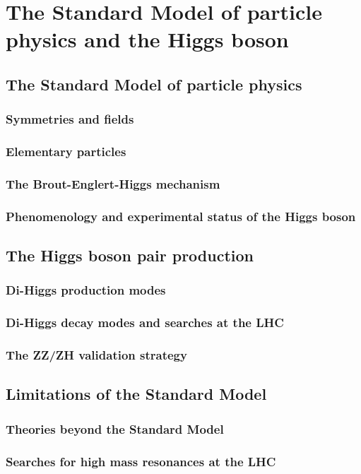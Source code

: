\chapter{The Standard Model of particle physics and the Higgs boson}

\section{The Standard Model of particle physics}
\subsection{Symmetries and fields}
\subsection{Elementary particles}
\subsection{The Brout-Englert-Higgs mechanism}
\subsection{Phenomenology and experimental status of the Higgs boson}

\section{The Higgs boson pair production}
\subsection{Di-Higgs production modes}
\subsection{Di-Higgs decay modes and searches at the LHC}
\subsection{The ZZ/ZH validation strategy}

\section{Limitations of the Standard Model}
\subsection{Theories beyond the Standard Model}
\subsection{Searches for high mass resonances at the LHC}
